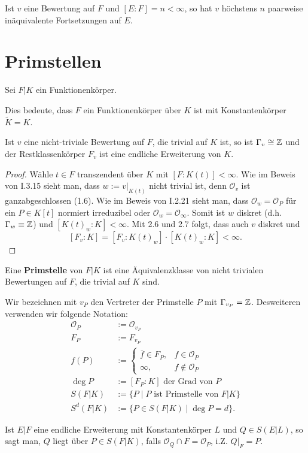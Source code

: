 \begin{korollar}
    Ist $v$ eine Bewertung auf $F$ und $[E:F] = n < \infty$, so hat $v$ höchstens $n$ paarweise inäquivalente
    Fortsetzungen auf $E$.
\end{korollar}

\section{Primstellen}
Sei $F | K$ ein Funktionenkörper.

\begin{definition}
    Dies bedeute, dass $F$ ein Funktionenkörper über $K$ ist mit Konstantenkörper $\tilde{K}=K$.
\end{definition}

\begin{satz}
    Ist $v$ eine nicht-triviale Bewertung auf $F$, die trivial auf $K$ ist,
    so ist $\Gamma_v \cong \mathbb{Z}$ und der Restklassenkörper $F_v$ ist eine endliche Erweiterung von $K$.
\end{satz}
\begin{proof}
    Wähle $t \in F$ transzendent über $K$ mit $[F:K(t)] < \infty$.
    Wie im Beweis von I.3.15 sieht man, dass $w:= v|_{K(t)}$ nicht trivial ist, denn $\mathcal{O}_v$ ist ganzabgeschlossen (1.6).
    Wie im Beweis von I.2.21 sieht man, dass $\mathcal{O}_w = \mathcal{O}_P$ für ein 
    $P \in K[t]$ normiert irreduzibel oder $\mathcal{O}_w = \mathcal{O}_{\infty}$.
    Somit ist $w$ diskret (d.h. $\Gamma_w \equiv \mathbb{Z}$) und $[K(t)_w:K] < \infty$.
    Mit 2.6 und 2.7 folgt, dass auch $v$ diskret und $$ [F_v:K] = [F_v:K(t)_w]\cdot [K(t)_w:K] < \infty.$$
\end{proof}

\begin{definition}
    Eine \textbf{Primstelle} von $F|K$ ist eine Äquivalenzklasse von nicht trivialen Bewertungen auf $F$, die trivial auf $K$ sind.

    Wir bezeichnen mit $v_P$ den Vertreter der Primstelle $P$ mit $\Gamma_{v_P} = \mathbb{Z}$. 
    Desweiteren verwenden wir folgende Notation:
    \begin{align*}
        \mathcal{O}_P &:= \mathcal{O}_{v_P}\\
        F_P &:= F_{v_P}\\
        f(P) &:= \begin{cases}
            \overline{f} \in F_P, & f \in \mathcal{O}_P\\
            \infty, & f \notin \mathcal{O}_P
        \end{cases}\\
        \deg P &:= [F_P:K] \text{ der Grad von }P\\
        S(F|K) &:= \{P \mid P \text{ ist Primstelle von } F|K\}\\
        S^d(F|K) &:= \{P \in S(F|K) \mid \deg P = d\}.
    \end{align*}

    Ist $E|F$ eine endliche Erweiterung mit Konstantenkörper $L$ und $ Q \in S(E|L)$, so sagt man, $Q$ liegt über $P \in S(F|K)$, falls
    $\mathcal{O}_Q \cap F = \mathcal{O}_P$, i.Z. $Q|_F = P$.
\end{definition}

